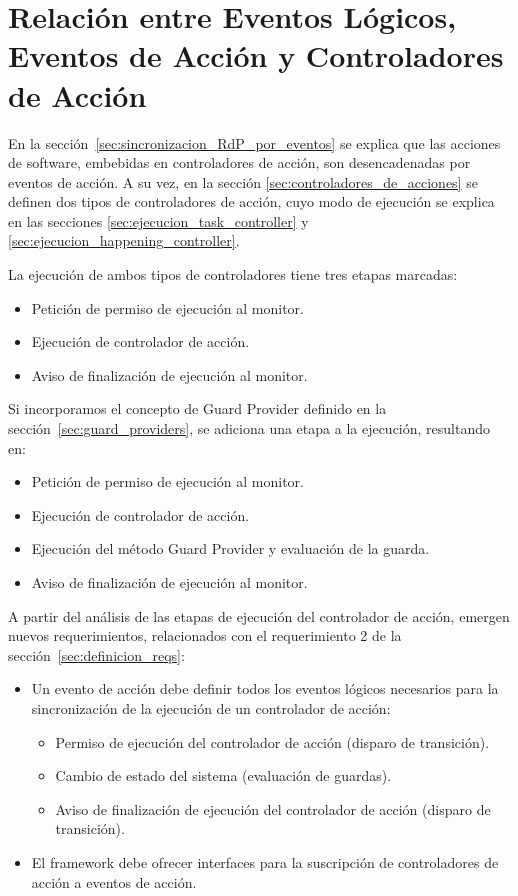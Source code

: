 \section{Relación entre Eventos Lógicos, Eventos de Acción y Controladores de
Acción}
\label{sec:relacion_evento_controlador}
En la sección~\ref{sec:sincronizacion_RdP_por_eventos} se explica que las
acciones de software, embebidas en controladores de acción, son desencadenadas
por eventos de acción. A su vez, en la sección
\ref{sec:controladores_de_acciones} se definen dos tipos de controladores de
acción, cuyo modo de ejecución se explica en las secciones
\ref{sec:ejecucion_task_controller} y \ref{sec:ejecucion_happening_controller}.

La ejecución de ambos tipos de controladores tiene tres etapas marcadas:
\begin{itemize}
  \item Petición de permiso de ejecución al monitor.
  \item Ejecución de controlador de acción.
  \item Aviso de finalización de ejecución al monitor.
\end{itemize}

Si incorporamos el concepto de Guard Provider definido en la
sección~\ref{sec:guard_providers}, se adiciona una etapa a la ejecución,
resultando en:
\begin{itemize}
  \item Petición de permiso de ejecución al monitor.
  \item Ejecución de controlador de acción.
  \item Ejecución del método Guard Provider y evaluación de la guarda.
  \item Aviso de finalización de ejecución al monitor.
\end{itemize}

A partir del análisis de las etapas de ejecución del controlador de acción,
emergen nuevos requerimientos, relacionados con el requerimiento 2 de la
sección~\ref{sec:definicion_reqs}:
\begin{itemize}
    \item Un evento de acción debe definir todos los eventos lógicos
    necesarios para la sincronización de la ejecución de un controlador de
    acción:
        \begin{itemize}
          \item Permiso de ejecución del controlador de acción (disparo de
          transición).
          \item Cambio de estado del sistema (evaluación de guardas).
          \item Aviso de finalización de ejecución del controlador de acción
          (disparo de transición).
        \end{itemize}
    \item El framework debe ofrecer interfaces para la suscripción de
    controladores de acción a eventos de acción.
\end{itemize}

